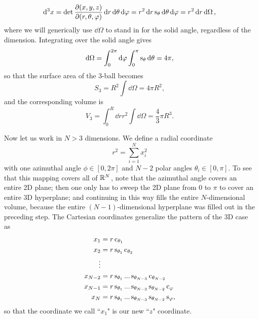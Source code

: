 \begin{equation}
  \dd[3]{x}=\det\pdv{(x,y,z)}{(r,\theta,\varphi)}
             \dd{r}\dd{\theta}\dd{\varphi}
      =r^2\dd{r}\operatorname{s}_\theta\dd{\theta}\dd{\varphi}=r^2\dd{r}\dd{\Omega},
\end{equation}
where we will generically use $\dd\Omega$ to stand in for the solid angle,
regardless of the dimension. Integrating over the solid angle gives
\begin{equation}
  \dd{\Omega}=\int_0^{2\pi}\dd{\varphi}\int_0^{\pi}\operatorname{s}_\theta\dd{\theta}=4\pi,
\end{equation}
so that the surface area of the 3-ball becomes
\begin{equation}\label{eq:3ds}
  S_3=R^2\int\dd{\Omega}=4\pi R^2,
\end{equation}
and the corresponding volume is
\begin{equation}\label{eq:3dv}
  V_3=\int_0^R\dd{r}r^2\int\dd{\Omega}=\frac{4}{3}\pi R^3.
\end{equation}

Now let us work in $N>3$ dimensions. We define a radial coordinate
\begin{equation}
  r^2=\sum_{i=1}^N x_i^2
\end{equation}
with one azimuthal angle $\phi\in[0,2\pi]$ and $N-2$ polar angles 
$\theta_i\in[0,\pi]$. To see that this mapping covers all of $\mathbb{R}^N$,
note that the azimuthal angle covers an entire 2D plane; then one
only has to sweep the 2D plane from 0 to $\pi$ to cover an entire
3D hyperplane; and continuing in this way fills the entire $N$-dimensional 
volume, because the entire $(N-1)$-dimensional hyperplane was filled out in 
the preceding step. The Cartesian coordinates generalize the pattern
of the 3D case as 
\begin{equation}\label{eq:cartesianN}
  \begin{aligned}
        x_1&=r\operatorname{c}_{\theta_1}\\
        x_2&=r\operatorname{s}_{\theta_1}\operatorname{c}_{\theta_2}\\
     \vdots&\\
    x_{N-2}&=r\operatorname{s}_{\theta_1}...\operatorname{s}_{\theta_{N-3}}\operatorname{c}_{\theta_{N-2}}\\
    x_{N-1}&=r\operatorname{s}_{\theta_1}...\operatorname{s}_{\theta_{N-3}}\operatorname{s}_{\theta_{N-2}}\operatorname{c}_\varphi\\
        x_N&=r\operatorname{s}_{\theta_1}...\operatorname{s}_{\theta_{N-3}}\operatorname{s}_{\theta_{N-2}}\operatorname{s}_\varphi,
  \end{aligned}
\end{equation}
so that the coordinate we call ``$x_1$" is our new ``$z$" coordinate.

